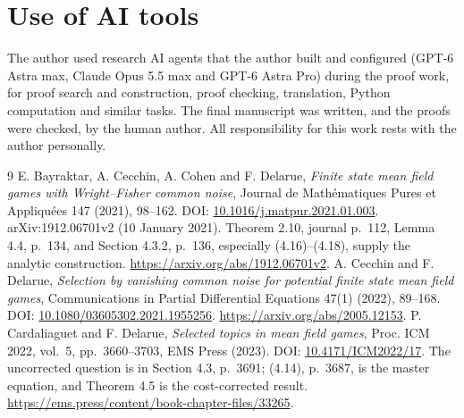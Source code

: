 \documentclass[11pt,a4paper]{article}
\begin{document}
\section*{Use of AI tools}
The author used research AI agents that the author built and configured (GPT-6 Astra max,
Claude Opus 5.5 max and GPT-6 Astra Pro) during the proof work, for proof search and
construction, proof checking, translation, Python computation and similar tasks. The final
manuscript was written, and the proofs were checked, by the human author. All responsibility
for this work rests with the author personally.

\begin{thebibliography}{9}
 E. Bayraktar, A. Cecchin, A. Cohen and F. Delarue,
\emph{Finite state mean field games with Wright--Fisher common noise},
Journal de Math\'ematiques Pures et Appliqu\'ees 147 (2021), 98--162.
DOI: \href{https://doi.org/10.1016/j.matpur.2021.01.003}{10.1016/j.matpur.2021.01.003}.
arXiv:1912.06701v2 (10 January 2021).
Theorem 2.10, journal p.~112, Lemma 4.4, p.~134, and Section 4.3.2,
p.~136, especially (4.16)--(4.18), supply the analytic construction.
\url{https://arxiv.org/abs/1912.06701v2}.
 A. Cecchin and F. Delarue,
\emph{Selection by vanishing common noise for potential finite state
mean field games}, Communications in Partial Differential Equations
47(1) (2022), 89--168.
DOI: \href{https://doi.org/10.1080/03605302.2021.1955256}{10.1080/03605302.2021.1955256}.
\url{https://arxiv.org/abs/2005.12153}.
 P. Cardaliaguet and F. Delarue,
\emph{Selected topics in mean field games}, Proc. ICM 2022, vol.~5,
pp.~3660--3703, EMS Press (2023).
DOI: \href{https://doi.org/10.4171/ICM2022/17}{10.4171/ICM2022/17}.
The uncorrected question is in Section 4.3, p.~3691; (4.14), p.~3687,
is the master equation, and Theorem 4.5 is the cost-corrected result.
\url{https://ems.press/content/book-chapter-files/33265}.
\end{thebibliography}
\end{document}
